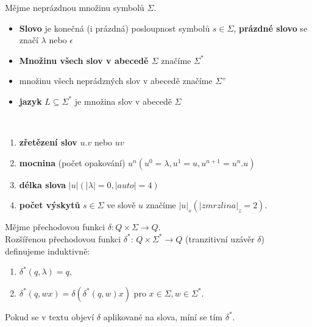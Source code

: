 \documentclass[../main.tex]{subfiles}
\begin{document}
\begin{definition}
    Mějme neprázdnou množinu symbolů $\Sigma$.
    \begin{itemize}
        \item \textbf{Slovo} je konečná (i prázdná) posloupnost symbolů $s \in \Sigma$, \textbf{prázdné slovo}
        se značí $\lambda$ nebo $\epsilon$
        \item \textbf{Množinu všech slov v abecedě $\Sigma$} značíme $\Sigma^*$
        \item množinu všech neprádzných slov v abecedě značíme  $\Sigma^+$
        \item \textbf{jazyk} $L \subseteq \Sigma^*$ je množina slov v abecedě $\Sigma$
    \end{itemize}
\end{definition}
\begin{definition}
    $ $\\
    \begin{enumerate}
        \item \textbf{zřetězení slov} $u.v$ nebo $uv$
        \item \textbf{mocnina} (počet opakování) $u^n (u^0 = \lambda, u^1 = u, u^{n+1} = u^n.u)$
        \item \textbf{délka slova} $|u| (|\lambda|=0,|auto|=4)$
        \item \textbf{počet výskytů} $s \in \Sigma$ ve slově $u$ značíme $|u|_s (|zmrzlina|_z = 2)$.
    \end{enumerate}
\end{definition}

\begin{definition}
    Mějme přechodovou funkci $\delta : Q \times \Sigma \rightarrow Q$.\\
    Rozšířenou přechodovou funkci $\delta^*$: $Q \times \Sigma^* \rightarrow Q$ (tranzitivní uzávěr $\delta$)\\
    definujeme induktivně:
    \begin{enumerate}
        \item $\delta^*(q,\lambda) = q$,
        \item $\delta^*(q,wx) = \delta(\delta^*(q,w)x)$ pro $x\in \Sigma, w \in \Sigma^*$.
    \end{enumerate} 
\end{definition}
\begin{remark}
    Pokud se v textu objeví $\delta$ aplikované na slova, míní se tím $\delta^*$.
\end{remark}
\end{document}
